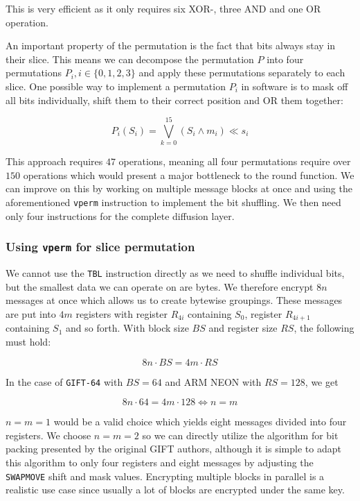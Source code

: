 This is very efficient as it only requires six XOR-, three AND and one OR
operation.

An important property of the permutation is the fact that bits always stay in
their slice. This means we can decompose the permutation $P$ into four
permutations $P_i,i\in\{0,1,2,3\}$ and apply these permutations
separately to each slice. One possible way to implement a permutation $P_i$ in
software is to mask off all bits individually, shift them to their correct
position and OR them together:

\[
    P_i(S_i)=\bigvee_{k=0}^{15}{(S_i\land m_i) \ll s_i}
\]

This approach requires $47$ operations, meaning all four permutations require
over $150$ operations which would present a major bottleneck to the round
function. We can improve on this by working on multiple message blocks at once
and using the aforementioned \texttt{vperm} instruction to implement the bit
shuffling. We then need only four instructions for the complete diffusion
layer.

\subsubsection{Using \texttt{vperm} for slice permutation}

We cannot use the \texttt{TBL} instruction directly as we need to shuffle
individual bits, but the smallest data we can operate on are bytes. We
therefore encrypt $8n$ messages at once which allows us to create bytewise
groupings. These messages are put into $4m$ registers with register $R_{4i}$
containing $S_0$, register $R_{4i+1}$ containing $S_1$ and so forth. With block
size $BS$ and register size $RS$, the following must hold:

\[
    8n\cdot BS=4m\cdot RS
\]

In the case of \texttt{GIFT-64} with $BS=64$ and ARM NEON with $RS=128$, we get

\[
    8n\cdot 64=4m\cdot 128\Leftrightarrow n=m
\]

$n=m=1$ would be a valid choice which yields eight messages divided into four
registers. We choose $n=m=2$ so we can directly utilize the algorithm for bit
packing presented by the original GIFT authors, although it is simple to adapt
this algorithm to only four registers and eight messages by adjusting the
\texttt{SWAPMOVE} shift and mask values. Encrypting multiple blocks in parallel
is a realistic use case since usually a lot of blocks are encrypted under the
same key.


